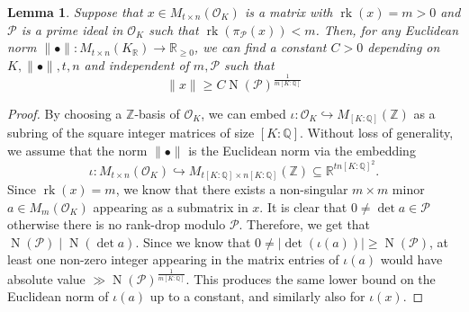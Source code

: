 \documentclass{amsart}
\newtheorem{lemma}[theorem]{Lemma}
\newcommand{\OK}{\mathcal{O}_K}
\DeclareMathOperator{\rank}{rk}
\DeclareMathOperator{\N}{N}
\begin{document}
\begin{lemma}
Suppose that $x \in M_{t \times n }\left(\mathcal{O}_{K}\right)$ is a matrix with $\rank(x) = m>0$ and $\mathcal{P}$ is a prime ideal in $\mathcal{O}_K$ such that $\rank(\pi_\mathcal{P}(x)) < m$. Then, for any Euclidean norm $\| \bullet \|: M_{t \times n }(K_\mathbb{R})  \rightarrow \mathbb{R}_{\ge 0}$, we can find a constant $C>0$ depending on $K,\|\bullet\|,t,n$ and independent of $m,\mathcal{P}$ such that 
\begin{equation}
\|x\| \ge C \N(\mathcal{P})^{\frac{1}{m[K:\mathbb{Q}]}}
\end{equation}
\label{le:rankdrop}
\end{lemma}
\begin{proof}
By choosing a $\mathbb{Z}$-basis of $\OK$, we can embed $\iota:\mathcal{O}_K \hookrightarrow M_{[K:\mathbb{Q}]}(\mathbb{Z})$ as a subring of the square integer matrices of size $[K:\mathbb{Q}]$. 
Without loss of generality, we assume that the norm $\|\bullet \|$ is the Euclidean norm via the embedding 
$$\iota: M_{t \times n }(\OK)\hookrightarrow M_{t[K:\mathbb{Q}] \times n[K:\mathbb{Q}]}(\mathbb{Z}) \subseteq \mathbb{R}^{tn[K:\mathbb{Q}]^{2}}.$$ 
Since $\rank(x)=m$, we know that there exists a non-singular $m \times m$ minor $a \in M_{m}(\OK)$ appearing as a submatrix in $x$. It is clear that $ 0 \neq \det a \in \mathcal{P}$ otherwise there is no rank-drop modulo $\mathcal{P}$. Therefore, we get that 
$\N(\mathcal{P}) \mid \N(\det a).$
Since we know that $0 \neq |\det(\iota(a))| \ge \N(\mathcal{P})$, at least one non-zero integer appearing in the matrix entries of $\iota(a)$ would have absolute value $\gg \N(\mathcal{P})^{\frac{1}{m[K:\mathbb{Q}]}}$. This produces the same lower bound on the Euclidean norm of $\iota(a)$ up to a constant, and similarly also for $\iota(x)$.
\end{proof}
\end{document}
